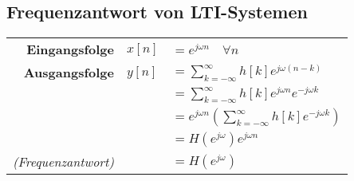 \documentclass[8pt]{article}
\begin{document}
		\subsection{Frequenzantwort von LTI-Systemen}
			\begin{tabular}{ r p{0.35cm} l }
				\textbf{Eingangsfolge } & $x[n]$ & $ = e^{j\omega n } \quad \forall n$\\
				\textbf{Ausgangsfolge } & $y[n]$ & $ = \sum\limits_{k = -\infty}^{\infty} h[k] e^{j\omega (n-k)}$\\
				& & $= \sum\limits_{k = -\infty}^{\infty}h[k]e^{j\omega n}e^{-j\omega k}$\\
				& & $= e^{j \omega n} ( \sum\limits_{k = -\infty}^{\infty} h[k] e^{-j\omega k})$\\
				& & $= H(e^{j\omega}) e^{j\omega n}$\\
				\textit{(Frequenzantwort)} & & $= H(e^{j \omega})$
			\end{tabular}
\end{document}
